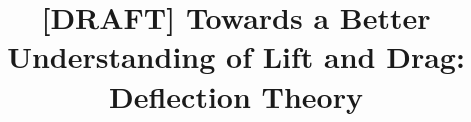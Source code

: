 \setlength{\droptitle}{-4\baselineskip} %

\pretitle{\begin{center}\Huge\bfseries} %
\posttitle{\end{center}} %
\title{[DRAFT] Towards a Better Understanding of Lift and Drag: Deflection Theory} %

\author{
}

\date{} %

\renewcommand{\maketitlehookd}{

}
